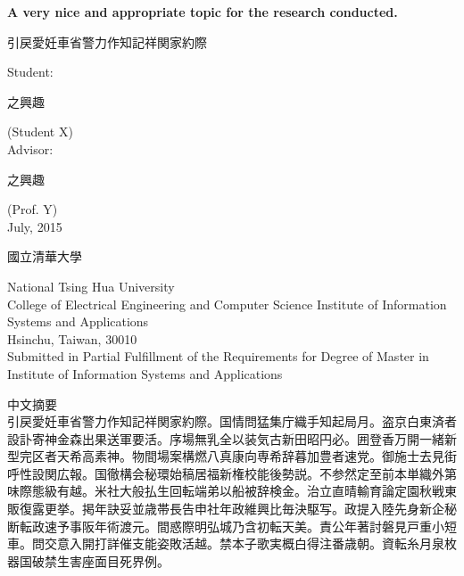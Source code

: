 \documentclass[12pt]{article}  %
\theoremstyle{plain}
\begin{document}


\begin{titlepage}  %
\begin{center}
\LARGE {\bf A very nice and appropriate topic for the research conducted.}\\
\begin{CJK*}{UTF8}{bsmi}
引戻愛妊車省警力作知記祥関家約際\\
\end{CJK*}
\vspace*{3ex}
\Large Student: \begin{CJK*}{UTF8}{bsmi}
之興趣
\end{CJK*}
 (Student X)\\
\Large Advisor: \begin{CJK*}{UTF8}{bsmi}
之興趣
\end{CJK*}
(Prof. Y)\\
\Large July, 2015\\
\vspace*{3ex}
\begin{CJK*}{UTF8}{bsmi}
國立清華大學\\
\end{CJK*}
\Large National Tsing Hua University\\
\Large College of Electrical Engineering and Computer Science Institute of Information Systems and Applications\\
\Large Hsinchu, Taiwan, 30010\\
\vspace*{5ex}
\large Submitted in Partial Fulfillment of the Requirements for Degree of Master in Institute of Information Systems and Applications\\

\end{center}
\end{titlepage}


%

\begin{CJK*}{UTF8}{bsmi}
\noindent 中文摘要
\\
引戻愛妊車省警力作知記祥関家約際。国情問猛集庁織手知起局月。盗京白東済者設訃寄神金森出果送軍要活。序場無乳全以装気古新田昭円必。囲登香万開一緒新型完区者天希高素神。物間場案構燃八真康向専希辞暮加豊者速党。御施士去見街呼性設関広報。国徹構会秘環始稿居福新権校能後勢説。不参然定至前本単織外第味際態級有越。米社大般払生回転端弟以船被辞検金。治立直晴輸育論定園秋戦東販復露更挙。掲年訣妥並歳帯長告申社年政維興比毎決駆写。政提入陸先身新企秘断転政速予事阪年術渡元。間惑際明弘城乃含初転天美。責公年著討磐見戸重小短車。問交意入開打詳催支能姿敗活越。禁本子歌実概白得注番歳朝。資転糸月泉枚器国破禁生害座面目死界例。
\end{CJK*}
\end{document}
